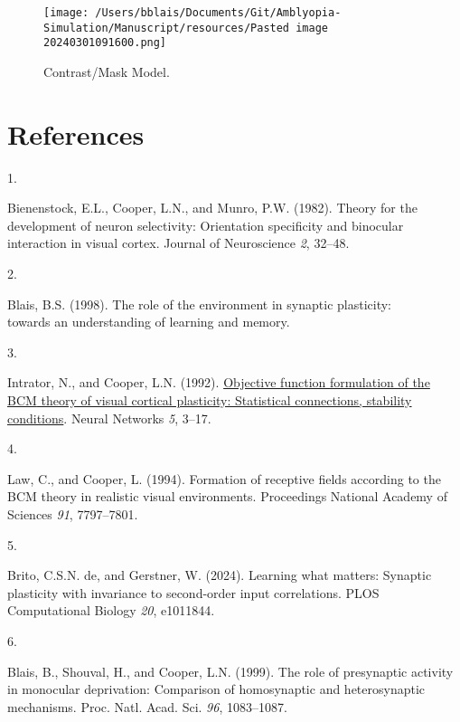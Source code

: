 \documentclass[
]{article}
\newlength{\cslhangindent}
\newlength{\csllabelwidth}
\newenvironment{CSLReferences}[2] %
 {\begin{list}{}{%
  \setlength{\itemindent}{0pt}
  \setlength{\leftmargin}{0pt}
  \setlength{\parsep}{0pt}
  \ifodd #1
   \setlength{\leftmargin}{\cslhangindent}
   \setlength{\itemindent}{-1\cslhangindent}
  \fi
  \setlength{\itemsep}{#2\baselineskip}}}
 {\end{list}}
\newcommand{\CSLLeftMargin}[1]{\parbox[t]{\csllabelwidth}{\strut#1\strut}}
\newcommand{\CSLRightInline}[1]{\parbox[t]{\linewidth - \csllabelwidth}{\strut#1\strut}}
\begin{document}
\begin{figure}
\centering
\texttt{[image: /Users/bblais/Documents/Git/Amblyopia-Simulation/Manuscript/resources/Pasted image 20240301091600.png]}
\caption{Contrast/Mask
Model.}\label{fig:Pasted_image_20240301091600.png}
\end{figure}

\section*{References}\label{sec:references}

\label{refs}
\begin{CSLReferences}{0}{1}
\CSLLeftMargin{1. }%
\CSLRightInline{Bienenstock, E.L., Cooper, L.N., and Munro, P.W. (1982).
Theory for the development of neuron selectivity: Orientation
specificity and binocular interaction in visual cortex. Journal of
Neuroscience \emph{2}, 32--48.}

\CSLLeftMargin{2. }%
\CSLRightInline{Blais, B.S. (1998). The role of the environment in
synaptic plasticity:\\
towards an understanding of learning and memory.}

\CSLLeftMargin{3. }%
\CSLRightInline{Intrator, N., and Cooper, L.N. (1992).
\href{ftp://cns.brown.edu/nin/papers/cooper.ps.Z}{Objective function
formulation of the {BCM} theory of visual cortical plasticity:
Statistical connections, stability conditions}. Neural Networks
\emph{5}, 3--17.}

\CSLLeftMargin{4. }%
\CSLRightInline{Law, C., and Cooper, L. (1994). Formation of receptive
fields according to the {BCM} theory in realistic visual environments.
Proceedings National Academy of Sciences \emph{91}, 7797--7801.}

\CSLLeftMargin{5. }%
\CSLRightInline{Brito, C.S.N. de, and Gerstner, W. (2024). Learning what
matters: Synaptic plasticity with invariance to second-order input
correlations. PLOS Computational Biology \emph{20}, e1011844.}

\CSLLeftMargin{6. }%
\CSLRightInline{Blais, B., Shouval, H., and Cooper, L.N. (1999). The
role of presynaptic activity in monocular deprivation: Comparison of
homosynaptic and heterosynaptic mechanisms. Proc. Natl. Acad. Sci.
\emph{96}, 1083--1087.}

\end{CSLReferences}
\end{document}
